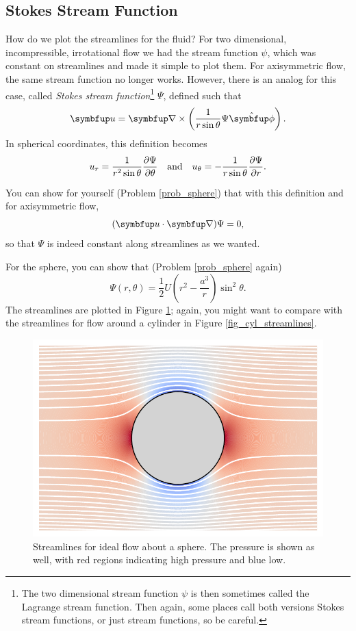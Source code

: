 \subsection{Stokes Stream Function}

How do we plot the streamlines for the fluid?  For two dimensional, incompressible, irrotational flow we had the stream function $\psi$, which was constant on streamlines and made it simple to plot them.  For axisymmetric flow, the same stream function no longer works.  However, there is an analog for this case, called \emph{Stokes stream function}\footnote{The two dimensional stream function $\psi$ is then sometimes called the Lagrange stream function.  Then again, some places call both versions Stokes stream functions, or just stream functions, so be careful.} $\Psi$, defined such that
\begin{equation}
\vec{u} = \grad \times \left( \frac{1}{r\sin \theta} \Psi \unit{\phi} \right).
\end{equation}
In spherical coordinates, this definition becomes
\begin{equation}
\label{eq_stokes_stream}
u_r = \frac{1}{r^2 \sin \theta} \frac{\partial {\Psi}}{\partial {\theta}} \quad \text{and} \quad u_\theta = -\frac{1}{r \sin \theta} \frac{\partial {\Psi}}{\partial {r}}.
\end{equation}

You can show for yourself (Problem \ref{prob_sphere}) that with this definition and for axisymmetric flow, 
\[
(\vec{u} \cdot \grad) \Psi = 0,
\]
so that $\Psi$ is indeed constant along streamlines as we wanted.  

For the sphere, you can show that (Problem \ref{prob_sphere} again)
\begin{equation}
\Psi (r, \theta) = \frac{1}{2} U \left( r^2 - \frac{a^3}{r} \right) \sin^2 \theta.
\end{equation}
The streamlines are plotted in Figure \ref{fig_sphere_lines}; again, you might want to compare with the streamlines for flow around a cylinder in Figure \ref{fig_cyl_streamlines}.

\begin{figure}
\centering
\includegraphics[width=0.8\linewidth]{Figures/Chapter6/fig_sphere_lines}
\caption{Streamlines for ideal flow about a sphere.  The pressure is shown as well, with red regions indicating high pressure and blue low.}
\label{fig_sphere_lines}
\end{figure}

